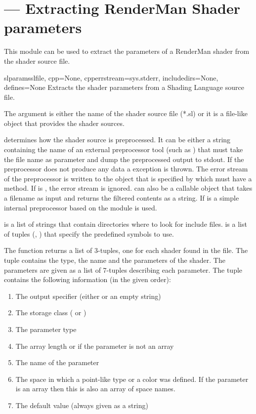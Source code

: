 \section{ ---
          Extracting RenderMan Shader parameters}
\label{slparams}


This module can be used to extract the parameters of a RenderMan
shader from the shader source file.

\begin{funcdesc}{slparams}{slfile, cpp=None, cpperrstream=sys.stderr, includedirs=None, defines=None}
Extracts the shader parameters from a Shading Language source file. 

The argument  is either the name of the shader source file
(*.sl) or it is a file-like object that provides the shader sources.

 determines how the shader source is preprocessed. It can be
either a string containing the name of an external preprocessor tool
(such as ) that must take the file name as parameter and
dump the preprocessed output to stdout. If the preprocessor does not
produce any data a  exception is
thrown. The error stream of the preprocessor is written to the object
that is specified by  which must have a
 method. If  is , the error 
stream is ignored.  can also be a callable object that takes a
filename as input and returns the filtered contents as a string. If
 is  a simple internal preprocessor based on the 
 module is used.

 is a list of strings that contain directories where to 
look for include files.  is a list of tuples (,
) that specify the predefined symbols to use.

The function returns a list of 3-tuples, one for each shader found in
the file. The tuple contains the type, the name and the parameters of
the shader. The parameters are given as a list of 7-tuples describing
each parameter. The tuple contains the following information (in the
given order):

\begin{enumerate}
\item The output specifier (either  or an empty string) 
\item The storage class ( or ) 
\item The parameter type 
\item The array length or  if the parameter is not an array 
\item The name of the parameter 
\item The space in which a point-like type or a color was defined. If the parameter is an array then this is also an array of space names. 
\item The default value (always given as a string)
\end{enumerate}


\end{funcdesc}
